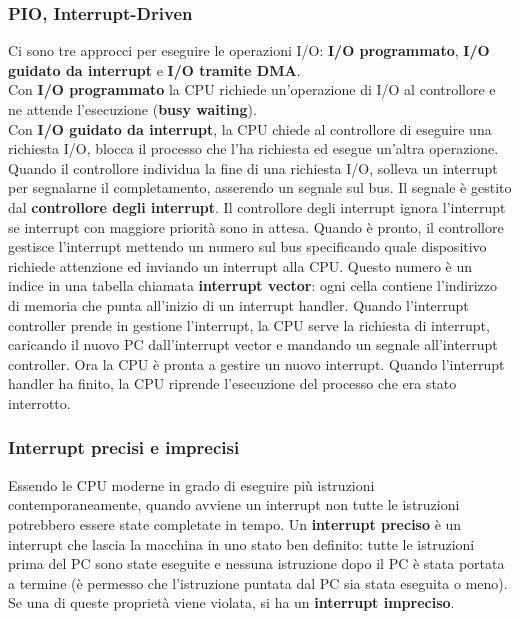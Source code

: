 \documentclass[12pt]{article}
\begin{document}
\subsubsection{PIO, Interrupt-Driven}
Ci sono tre approcci per eseguire le operazioni I/O: \textbf{I/O programmato}, \textbf{I/O guidato da interrupt} e 
\textbf{I/O tramite DMA}.\\
Con \textbf{I/O programmato} la CPU richiede un'operazione di I/O al controllore e ne attende l'esecuzione (\textbf{busy waiting}).\\
Con \textbf{I/O guidato da interrupt}, la CPU chiede al controllore di eseguire una richiesta I/O, blocca il processo che 
l'ha richiesta ed esegue un'altra operazione. Quando il controllore individua la fine di una richiesta I/O, solleva un 
interrupt per segnalarne il completamento, asserendo un segnale sul bus. Il segnale è gestito dal \textbf{controllore degli interrupt}. 
Il controllore degli interrupt ignora l'interrupt se interrupt con maggiore priorità sono in attesa. Quando è pronto, il 
controllore gestisce l'interrupt mettendo un numero sul bus specificando quale dispositivo richiede attenzione ed inviando 
un interrupt alla CPU. Questo numero è un indice in una tabella chiamata \textbf{interrupt vector}: ogni cella contiene 
l'indirizzo di memoria che punta all'inizio di un interrupt handler. Quando l'interrupt controller prende in gestione 
l'interrupt, la CPU serve la richiesta di interrupt, caricando il nuovo PC dall'interrupt vector e mandando un segnale 
all'interrupt controller. Ora la CPU è pronta a gestire un nuovo interrupt. Quando l'interrupt handler ha finito, la CPU 
riprende l'esecuzione del processo che era stato interrotto.\\
\subsubsection{Interrupt precisi e imprecisi}
Essendo le CPU moderne in grado di eseguire più istruzioni contemporaneamente, quando avviene un interrupt non tutte le 
istruzioni potrebbero essere state completate in tempo. Un \textbf{interrupt preciso} è un interrupt che lascia la macchina 
in uno stato ben definito: tutte le istruzioni prima del PC sono state eseguite e nessuna istruzione dopo il PC è stata 
portata a termine (è permesso che l'istruzione puntata dal PC sia stata eseguita o meno). Se una di queste proprietà viene 
violata, si ha un \textbf{interrupt impreciso}.
\end{document}
